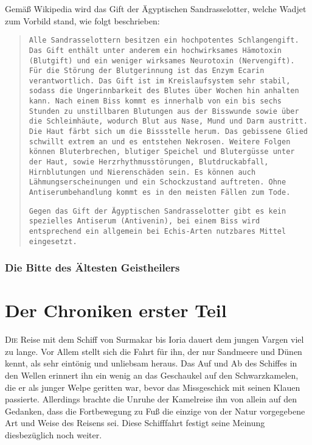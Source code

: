 \documentclass[a4paper]{scrreprt}
\def\capitalsfont{\usefont{U}{AnnSton}{xl}{n}\selectfont}
\newcommand{\capital}[2]{\lettrine[lines=8]{\capitalsfont #1}{#2}}
\begin{document}
	Gemäß Wikipedia wird das Gift der Ägyptischen Sandrasselotter, welche Wadjet zum Vorbild stand, wie folgt beschrieben:
	
	\begin{quotation}
		\texttt{Alle Sandrasselottern besitzen ein hochpotentes Schlangengift. Das Gift enthält	unter anderem ein hochwirksames Hämotoxin (Blutgift) und ein weniger wirksames Neurotoxin (Nervengift). Für die Störung der Blutgerinnung ist das Enzym Ecarin verantwortlich. Das Gift ist im Kreislaufsystem sehr stabil, sodass die	Ungerinnbarkeit des Blutes über Wochen hin anhalten kann. Nach einem Biss kommt es innerhalb von ein bis sechs Stunden zu unstillbaren Blutungen aus der
		Bisswunde sowie über die Schleimhäute, wodurch Blut aus Nase, Mund und Darm
		austritt. Die Haut färbt sich um die Bissstelle herum. Das gebissene Glied
		schwillt extrem an und es entstehen Nekrosen. Weitere Folgen können
		Bluterbrechen, blutiger Speichel und Blutergüsse unter der Haut, sowie
		Herzrhythmusstörungen, Blutdruckabfall, Hirnblutungen und Nierenschäden sein. Es
		können auch Lähmungserscheinungen und ein Schockzustand auftreten. Ohne
		Antiserumbehandlung kommt es in den meisten Fällen zum Tode.}

		\texttt{Gegen das Gift der Ägyptischen Sandrasselotter gibt es kein spezielles Antiserum (Antivenin), bei einem Biss wird entsprechend ein allgemein bei Echis-Arten	nutzbares Mittel eingesetzt.}
\end{quotation}

\section{Die Bitte des Ältesten Geistheilers}

\part{Der Chroniken erster Teil}
\capital{D}{ie} Reise mit dem Schiff von Surmakar bis Ioria dauert dem jungen Vargen viel zu lange. 
Vor Allem stellt sich die Fahrt für ihn, der nur Sandmeere und Dünen kennt, als sehr eintönig und unliebsam heraus.
Das Auf und Ab des Schiffes in den Wellen erinnert ihn ein wenig an das Geschaukel auf den Schwarzkamelen, die er als junger Welpe geritten war, bevor das Missgeschick mit seinen Klauen passierte.
Allerdings brachte die Unruhe der Kamelreise ihn von allein auf den Gedanken, dass die Fortbewegung zu Fuß die einzige von der Natur vorgegebene Art und Weise des Reisens sei.
Diese Schifffahrt festigt seine Meinung diesbezüglich noch weiter.
 
\end{document}

